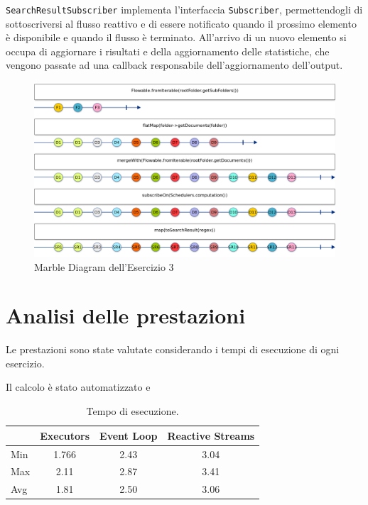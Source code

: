 \documentclass[a4paper]{article}
\begin{document}
\texttt{SearchResultSubscriber} implementa l'interfaccia \texttt{Subscriber}, permettendogli di sottoscriversi al flusso reattivo e di essere notificato quando il prossimo elemento \`e disponibile e quando il flusso \`e terminato.
%
All'arrivo di un nuovo elemento si occupa di aggiornare i risultati e della aggiornamento delle statistiche, che vengono passate ad una callback responsabile dell'aggiornamento dell'output.

\begin{figure}[H]

    \centering

    \includegraphics[width=\linewidth, height=\textheight,keepaspectratio]{ReactiveStreams}

    \caption{Marble Diagram dell'Esercizio 3}

    \label{fig:event-loop}

\end{figure}

\section{Analisi delle prestazioni}\label{analisi-delle-prestazioni}

Le prestazioni sono state valutate considerando i tempi di esecuzione di ogni esercizio.

Il calcolo \`e stato automatizzato e

\begin{table}[H]

\centering

\label{my-label}

\begin{tabular}{l|ccc}
\hline
    & Executors & Event Loop & Reactive Streams \\ \hline
Min & 1.766     & 2.43       & 3.04             \\
Max & 2.11      & 2.87       & 3.41             \\
Avg & 1.81      & 2.50       & 3.06             \\ \hline
\end{tabular}

\caption{Tempo di esecuzione.}

\label{Tabella speedup del sistema}

\end{table}

\end{document}
